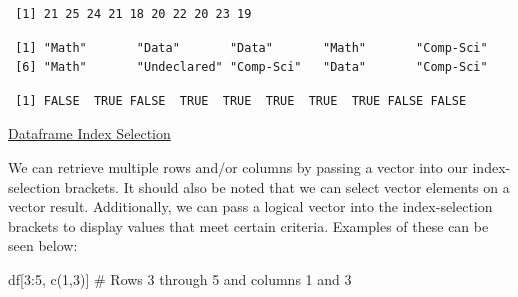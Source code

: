 \documentclass[
  letterpaper,
  DIV=11,
  numbers=noendperiod]{scrreprt}
\newenvironment{Shaded}{\begin{snugshade}}{\end{snugshade}}
\newcommand{\CommentTok}[1]{\textcolor[rgb]{0.37,0.37,0.37}{#1}}
\newcommand{\DecValTok}[1]{\textcolor[rgb]{0.68,0.00,0.00}{#1}}
\newcommand{\FunctionTok}[1]{\textcolor[rgb]{0.28,0.35,0.67}{#1}}
\newcommand{\NormalTok}[1]{\textcolor[rgb]{0.00,0.23,0.31}{#1}}
\newcommand{\SpecialCharTok}[1]{\textcolor[rgb]{0.37,0.37,0.37}{#1}}
\begin{document}
\begin{Shaded}
\end{Shaded}

\begin{verbatim}
 [1] 21 25 24 21 18 20 22 20 23 19
\end{verbatim}

\begin{Shaded}
\end{Shaded}

\begin{verbatim}
 [1] "Math"       "Data"       "Data"       "Math"       "Comp-Sci"  
 [6] "Math"       "Undeclared" "Comp-Sci"   "Data"       "Comp-Sci"  
\end{verbatim}

\begin{Shaded}
\end{Shaded}

\begin{verbatim}
 [1] FALSE  TRUE FALSE  TRUE  TRUE  TRUE  TRUE  TRUE FALSE FALSE
\end{verbatim}

\begin{watch}{}{}
    \href{https://youtu.be/Sgaa-F_HEYo}{Dataframe Index Selection}
\end{watch}

We can retrieve multiple rows and/or columns by passing a vector into
our index-selection brackets. It should also be noted that we can select
vector elements on a vector result. Additionally, we can pass a logical
vector into the index-selection brackets to display values that meet
certain criteria. Examples of these can be seen below:

\begin{Shaded}
\begin{Highlighting}[]
\NormalTok{df[}\DecValTok{3}\SpecialCharTok{:}\DecValTok{5}\NormalTok{, }\FunctionTok{c}\NormalTok{(}\DecValTok{1}\NormalTok{,}\DecValTok{3}\NormalTok{)] }\CommentTok{\# Rows 3 through 5 and columns 1 and 3 }
\end{Highlighting}
\end{Shaded}
\end{document}
